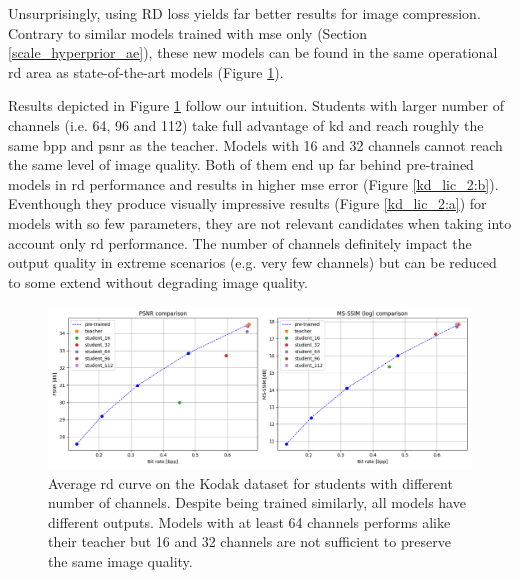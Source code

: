 \documentclass{article}
\begin{document}
Unsurprisingly, using \acrshort{RD} loss yields far better results for image compression. Contrary to similar models trained with \acrshort{mse} only (Section \ref{scale_hyperprior_ae}), these new models can be found in the same operational \acrshort{rd} area as state-of-the-art models (Figure \ref{kd_lic_1}).

Results depicted in Figure \ref{kd_lic_1} follow our intuition. Students with larger number of channels (i.e. 64, 96 and 112) take full advantage of \acrshort{kd} and reach roughly the same \acrshort{bpp} and \acrshort{psnr} as the teacher. Models with 16 and 32 channels cannot reach the same level of image quality. Both of them end up far behind pre-trained models in \acrshort{rd} performance and results in higher \acrshort{mse} error (Figure \ref{kd_lic_2:b}). Eventhough they produce visually impressive results (Figure \ref{kd_lic_2:a}) for models with so few parameters, they are not relevant candidates when taking into account only \acrshort{rd} performance. The number of channels definitely impact the output quality in extreme scenarios (e.g. very few channels) but can be reduced to some extend without degrading image quality.

\begin{figure}
    \centering
    \includegraphics[width=15cm]{../img/kd_lic_rd_channels.png}
    \caption[Average \acrshort{rd} curve on the Kodak dataset for students with different number of channels.]{Average \acrshort{rd} curve on the Kodak dataset for students with different number of channels. Despite being trained similarly, all models have different outputs. Models with at least 64 channels performs alike their teacher but 16 and 32 channels are not sufficient to preserve the same image quality.}
    \label{kd_lic_1}
\end{figure}
\end{document}
